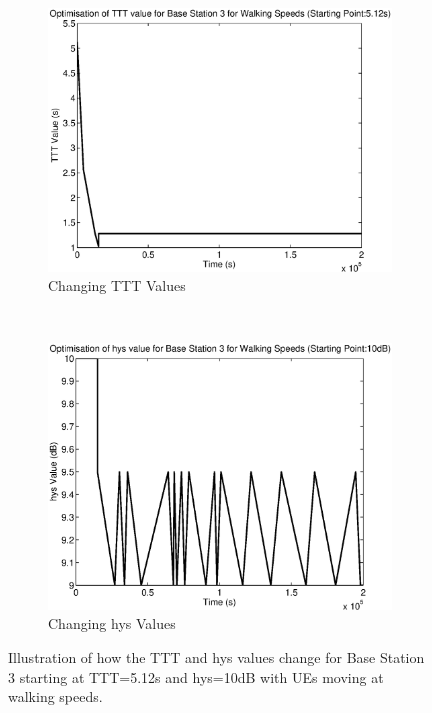 \begin{figure}[H]
        \centering
        \begin{subfigure}[b]{0.49\textwidth}
                \includegraphics[width=\textwidth]{figures/graphs/walkhigh/TTT3.eps}
                \caption{Changing TTT Values}
        \end{subfigure}%
        ~ %
        \begin{subfigure}[b]{0.49\textwidth}
                \includegraphics[width=\textwidth]{figures/graphs/walkhigh/hys3.eps}
                \caption{Changing hys Values}
        \end{subfigure}
        \caption{Illustration of how the TTT and hys values change for Base Station 3 starting at TTT=5.12s and hys=10dB with UEs moving at walking speeds.}
\end{figure}
